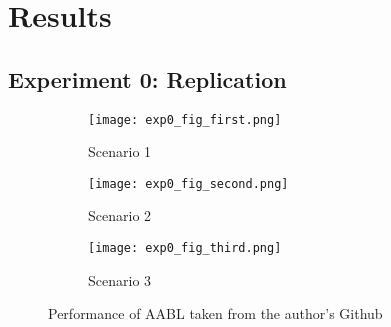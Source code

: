 \documentclass{article}
\begin{document}
\section{Results}
\setcounter{subsection}{-1}
\subsection{Experiment 0: Replication}
\label{results0}
\begin{figure}[H]
    \centering
    \begin{subfigure}[b]{0.45\textwidth}
        \texttt{[image: exp0\_fig\_first.png]}
        \caption{Scenario 1}
    \end{subfigure}
    \begin{subfigure}[b]{0.45\textwidth}
        \texttt{[image: exp0\_fig\_second.png]}
        \caption{Scenario 2}
    \end{subfigure}
    \begin{subfigure}[b]{0.45\textwidth}
        \texttt{[image: exp0\_fig\_third.png]}
        \caption{Scenario 3}
    \end{subfigure}
    \caption{Performance of AABL taken from the author's Github\cite{ayoobiGithub}}
    \label{fig:exp0-results.png}
\end{figure}
\end{document}
